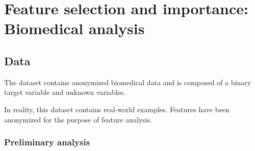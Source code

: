 \chapter{Feature selection and importance: Biomedical analysis}


\section{Data}

The dataset contains anonymized biomedical data and is composed of a binary target variable and unknown variables.

\begin{remark}
    In reality, this dataset contains real-world examples. Features have been anonymized for the purpose of feature analysis.
\end{remark}


\subsection{Preliminary analysis}

